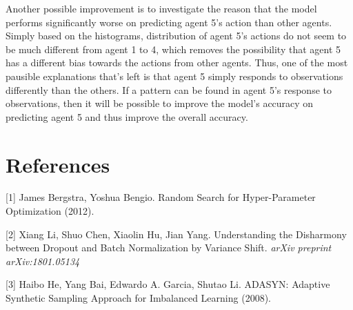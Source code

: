 \documentclass[10pt]{article}
\newcommand{\skipline}{\vspace{\baselineskip}}
\begin{document}
  \quad Another possible improvement is to investigate the reason that the model performs significantly worse on predicting agent 5's action than other agents. Simply based on the histograms, distribution of agent 5's actions do not seem to be much different from agent 1 to 4, which removes the possibility that agent 5 has a different bias towards the actions from other agents. Thus, one of the most pausible explanations that's left is that agent 5 simply responds to observations differently than the others. If a pattern can be found in agent 5's response to observations, then it will be possible to improve the model's accuracy on predicting agent 5 and thus improve the overall accuracy.

\skipline

\newpage \section*{References}

\footnotesize

  [1]	James Bergstra, Yoshua Bengio. Random Search for Hyper-Parameter Optimization (2012).


  [2] Xiang Li, Shuo Chen, Xiaolin Hu, Jian Yang. Understanding the Disharmony between Dropout and Batch Normalization by Variance Shift. \textit{arXiv preprint arXiv:1801.05134}

  [3] Haibo He, Yang Bai, Edwardo A. Garcia, Shutao Li. ADASYN: Adaptive Synthetic Sampling Approach for Imbalanced Learning (2008).
\end{document}
